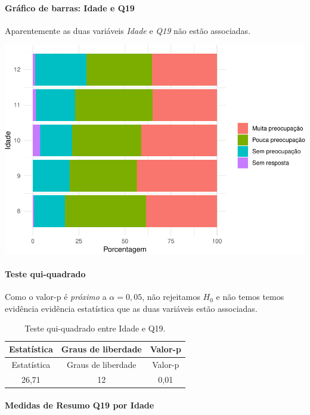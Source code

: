 \documentclass[]{article}
\let\oldparagraph\paragraph
\renewcommand{\paragraph}[1]{\oldparagraph{#1}\mbox{}}
\begin{document}
\hypertarget{gruxe1fico-de-barras-idade-e-q19}{%
\paragraph{Gráfico de barras: Idade e Q19}\label{gruxe1fico-de-barras-idade-e-q19}}

Aparentemente as duas variáveis \emph{Idade} e \emph{Q19} não estão associadas.

\begin{center}\includegraphics[width=0.75\linewidth]{relatorio_files/figure-latex/unnamed-chunk-265-1} \end{center}

\hypertarget{teste-qui-quadrado-29}{%
\paragraph{Teste qui-quadrado}\label{teste-qui-quadrado-29}}

Como o valor-p é \emph{próximo} a \(\alpha=0,05\), não rejeitamos \(H_0\) e não temos temos evidência evidência estatística que as duas variáveis estão associadas.

\begin{longtable}[]{@{}ccc@{}}
\caption{\label{tab:unnamed-chunk-266}Teste qui-quadrado entre Idade e Q19.}\tabularnewline
\toprule
Estatística & Graus de liberdade & Valor-p\tabularnewline
\midrule
\endfirsthead
\toprule
Estatística & Graus de liberdade & Valor-p\tabularnewline
\midrule
\endhead
26,71 & 12 & 0,01\tabularnewline
\bottomrule
\end{longtable}

\cleardoublepage

\hypertarget{medidas-de-resumo-q19-por-idade}{%
\paragraph{Medidas de Resumo Q19 por Idade}\label{medidas-de-resumo-q19-por-idade}}
\end{document}

